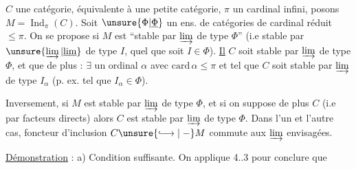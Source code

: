 $C$ une catégorie, équivalente à une petite catégorie, $\pi$ un cardinal infini, posons $M=\operatorname{Ind}_\pi(C)$. Soit $\unsure{\Phi|\underline{\Phi}}$ un ens. de catégories de cardinal réduit $\leq\pi$. On se propose  si $M$ est ``stable par $\varinjlim$ de type $\Phi$'' (i.e stable par $\unsure{\varinjlim|\underline{\lim}}$ de type $I$, quel que soit $I\in\Phi$). \uline{Il}    $C$ soit stable par $\varinjlim$ de type $\Phi$, et que de plus :  $\exists$ un ordinal  $\alpha$ avec $\mathrm{card}\,\alpha\leq\pi$ et tel que $C$ soit stable par $\varinjlim$ de type $I_\alpha$ (p. ex. tel que $I_\alpha\in\Phi$).

 Inversement, si $M$ est stable par $\varinjlim$ de type $\Phi$, et si on suppose de plus $C$  (i.e   par facteurs directs) alors $C$ est stable par $\varinjlim$ de type $\Phi$.  Dans l'un et l'autre cas,  foncteur d'inclusion $C\unsure{\lhook\joinrel\longrightarrow|\mathrel{-}}M$ commute aux $\varinjlim$ envisagées.

\uline{Démonstration} :  a) Condition suffisante. On applique 4..3 pour conclure que
